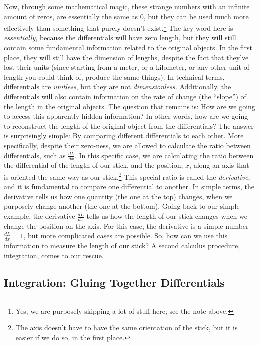 \documentclass[
  9pt,
]{extbook}
\theoremstyle{definition}
\theoremstyle{definition}
\theoremstyle{definition}
\theoremstyle{remark}
\begin{document}
Now, through some mathematical magic, these strange numbers with an infinite amount of zeros, are essentially the same as \(0\), but they can be used much more effectively than something that purely doesn't exist.\footnote{Yes, we are purposely skipping a lot of stuff here, see the note above.} The key word here is \emph{essentially}, because the differentials will have zero length, but they will still contain some fundamental information related to the original objects. In the first place, they will still have the dimension of lengths, despite the fact that they've lost their units (since starting from a meter, or a kilometer, or any other unit of length you could think of, produce the same things). In technical terms, differentials are \emph{unitless}, but they are not \emph{dimensionless.} Additionally, the differentials will also contain information on the rate of change (the ``slope'') of the length in the original objects. The question that remains is: How are we going to access this apparently hidden information? In other words, how are we going to reconstruct the length of the original object from the differentials? The answer is surprisingly simple: By comparing different differentials to each other. More specifically, despite their zero-ness, we are allowed to calculate the ratio between differentials, such as \(\frac{dL}{dx}\). In this specific case, we are calculating the ratio between the differential of the length of our stick, and the position, \(x\), along an axis that is oriented the same way as our stick.\footnote{The axis doesn't have to have the same orientation of the stick, but it is easier if we do so, in the first place.} This special ratio is called the \emph{derivative}, and it is fundamental to compare one differential to another. In simple terms, the derivative tells us how one quantity (the one at the top) changes, when we purposely change another (the one at the bottom). Going back to our simple example, the derivative \(\frac{dL}{dx}\) tells us how the length of our stick changes when we change the position on the axis. For this case, the derivative is a simple number \(\frac{dL}{dx}=1\), but more complicated cases are possible. So, how can we use this information to measure the length of our stick? A second calculus procedure, integration, comes to our rescue.

\hypertarget{integration-gluing-together-differentials}{%
\subsection{Integration: Gluing Together Differentials}\label{integration-gluing-together-differentials}}
\end{document}
